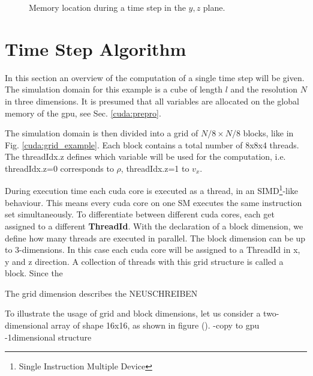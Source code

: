 \begin{figure}[!bp]
      \centering
       \caption{
           Memory location during a time step in the $y, z$ plane.
           }
       \label{cuda:timestep_algo_img}
\end{figure}

\clearpage
\section{Time Step Algorithm}

In this section an overview of the computation of a single time step will be given.
The simulation domain for this example is a cube of length $l$ and the resolution $N$ in three dimensions.
It is presumed that all variables are allocated on the global memory of the gpu, see Sec. \ref{cuda:prepro}.

The simulation domain is then divided into a grid of  $N/8 \times N/8$ blocks, like in Fig. \ref{cuda:grid_example}.
Each block contains a total number of 8x8x4 threads.
The threadIdx.z defines which variable will be used for the computation, i.e. threadIdx.z=0 corresponds to $\rho$, threadIdx.z=1 to $v_x$.



\clearpage

During execution time each cuda core is executed as a thread, in an SIMD\footnote{Single Instruction Multiple Device}-like behaviour.
This means every cuda core on one SM executes the same instruction set simultaneously. To differentiate between different cuda cores,
each get assigned to a different \textbf{ThreadId}.
With the declaration of a block dimension, we define how many threads are executed in parallel.
The block dimension can be up to 3-dimensions. In this case each cuda core will be assigned to a ThreadId in x, y and z direction.
A collection of threads with this grid structure is called a block.
Since the

The grid dimension describes the
NEUSCHREIBEN


To illustrate the usage of grid and block dimensions, let us consider a two-dimensional array of shape 16x16, as shown in figure ().
-copy to gpu
-1dimensional structure

